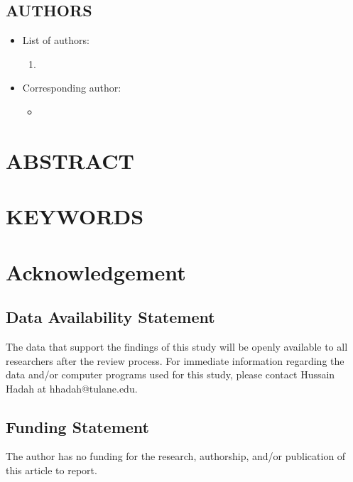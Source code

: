 \documentclass[12pt,english]{article}
\begin{document}
\subsection*{AUTHORS}
\begin{itemize}[label={}, leftmargin=*]
    \item List of authors:
    \begin{enumerate}
        \item \AUTHORHADAHINFO
    \end{enumerate}
    \item Corresponding author:
    \begin{itemize}
        \item \textbf{\AUTHORHADAHINFO}
    \end{itemize}
\end{itemize}
\clearpage 

\doublespacing
\section*{ABSTRACT}
\PAPERABSTRACT
\clearpage 

\doublespacing
\section*{KEYWORDS}
\PAPERKEYWORDS
\clearpage 


\doublespacing
\section*{Acknowledgement}
\ACKNOWLEDGMENTS
\clearpage 

\subsection*{Data Availability Statement}
The data that support the findings of this study will be openly available to all researchers after the review process. For immediate information regarding the data and/or computer programs used for this study, please contact Hussain Hadah at hhadah@tulane.edu.

\subsection*{Funding Statement}

The author has no funding for the research, authorship, and/or publication of this article to report.
\end{document}
